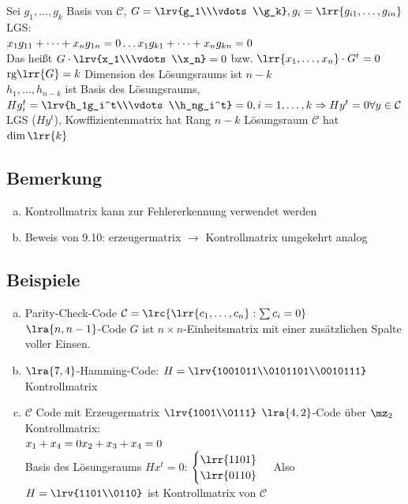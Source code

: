 		Sei $g_1,\dots,g_k$ Basis von $\mathcal{C}$, $G=\lrv{g_1\\\vdots\\g_k},g_i=\lrr{g_{i1},\dots,g_{in}}$
		LGS:\\
		$x_1g_{11}+\dots+x_ng_{1n}=0\\
		\dots\\
		x_1g_{k1}+\dots+x_ng_{kn}=0$\\
		Das heißt $G\cdot\lrv{x_1\\\vdots\\x_n}=0$ bzw. $\lrr{x_1,\dots,x_n}\cdot G^t=0$\\
		$\mbox{rg}\lrr{G}=k$ Dimension des Lösungsraums ist $n-k$\\
		$h_1,\dots,h_{n-k}$ ist Basis des Lösungsraums,\\
		$Hg_i^t=\lrv{h_1g_i^t\\\vdots\\h_ng_i^t}=0,i=1,\dots,k\Rightarrow Hy^t=0\forall y\in\mathcal{C}$\\
		LGS ($Hy^t$), Kowffizientenmatrix hat Rang $n-k$ Lösungsraum $\mathcal{C}$ hat $\dim\lrr{k}$
		
	\subsection{Bemerkung}
		\begin{enumerate}[a)]
			\item Kontrollmatrix kann zur Fehlererkennung verwendet werden
			\item Beweis von 9.10: erzeugermatrix $\rightarrow$ Kontrollmatrix umgekehrt analog
		\end{enumerate}

	\subsection{Beispiele}
		\begin{enumerate}[a)]
			\item Parity-Check-Code $\mathcal{C}=\lrc{\lrr{c_1,\dots,c_n}:\sum c_i=0}$\\
				$\lra{n,n-1}$-Code $G$ ist $n\times n$-Einheitsmatrix mit einer zusätzlichen Spalte voller Einsen.
			\item $\lra{7,4}$-Hamming-Code: $H=\lrv{1001011\\0101101\\0010111}$ Kontrollmatrix
			\item $\mathcal{C}$ Code mit Erzeugermatrix $\lrv{1001\\0111}$ $\lra{4,2}$-Code über $\mz_2$\\
				Kontrollmatrix:\\
				$x_1+x_4=0\\
				x_2+x_3+x_4=0$\\
				Basis des Lösungsraums $Hx^t=0$: $\begin{cases}\lrr{1101}\\\lrr{0110}\end{cases}$
				Also $H=\lrv{1101\\0110}$ ist Kontrollmatrix von $\mathcal{C}$
		\end{enumerate}

